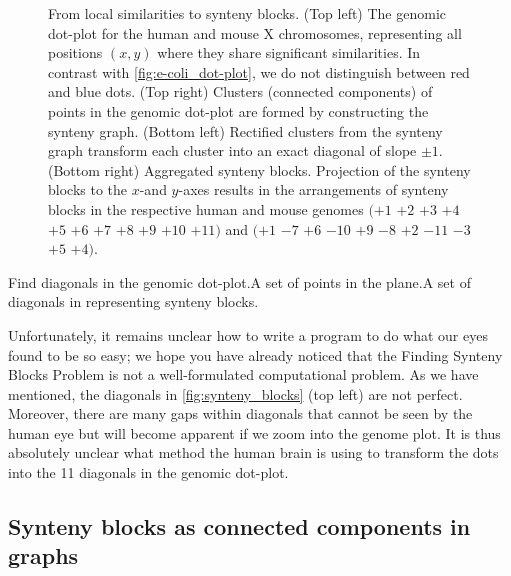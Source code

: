 \begin{figure}[p]
\begin{tabular}{c @{\hskip 2em} c}
\end{tabular}
\caption{From local similarities to synteny blocks. (Top left) The genomic dot-plot for the human and mouse X chromosomes, representing all positions $(x,y)$ where they share significant similarities.  In contrast with \autoref{fig:e-coli_dot-plot}, we do not distinguish between red and blue dots. (Top right) Clusters (connected components) of points in the genomic dot-plot are formed by constructing the synteny graph.  (Bottom left) Rectified clusters from the synteny graph transform each cluster into an exact diagonal of slope $\pm 1$. (Bottom right) Aggregated synteny blocks.  Projection of the synteny blocks to the $x$-and $y$-axes results in the arrangements of synteny blocks in the respective human and mouse genomes $(+1$ $+2$ $+3$ $+4$ $+5$ $+6$ $+7$ $+8$ $+9$ $+10$ $+11)$ and  $(+1$ $-7$ $+6$  $-10$  $+9$  $-8$  $+2$ $-11$ $-3$ $+5$ $+4)$.}
\label{fig:synteny_blocks}
\end{figure}

\begin{problem}{Find diagonals in the genomic dot-plot.}{A set of points  in the plane.}{A set of diagonals in  representing synteny blocks.}
\end{problem}

\noindent Unfortunately, it remains unclear how to write a program to do what our eyes found to be so easy; we hope you have already noticed that the Finding Synteny Blocks Problem is not a well-formulated computational problem. As we have mentioned, the diagonals in \autoref{fig:synteny_blocks} (top left) are not perfect. Moreover, there are many gaps within diagonals that cannot be seen by the human eye but will become apparent if we zoom into the genome plot. It is thus absolutely unclear what method the human brain is using to transform the dots into the 11 diagonals in the genomic dot-plot.\\

\begin{qbox}\end{qbox}

\vspace{-0.5\baselineskip}

\subsection{Synteny blocks as connected components in graphs}
\label{subsec:synteny_blocks_as_connected_components_in_graphs}

